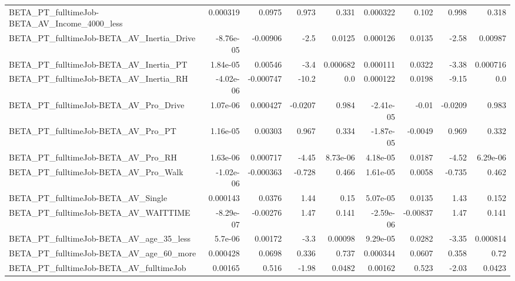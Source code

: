 \begin{tabular}{lrrrrrrrr}
BETA\_PT\_fulltimeJob-BETA\_AV\_Income\_4000\_less       &    0.000319 &       0.0975 &    0.973 &    0.331 &   0.000322 &       0.102 &        0.998 &         0.318 \\
BETA\_PT\_fulltimeJob-BETA\_AV\_Inertia\_Drive          &   -8.76e-05 &     -0.00906 &     -2.5 &   0.0125 &   0.000126 &      0.0135 &        -2.58 &       0.00987 \\
BETA\_PT\_fulltimeJob-BETA\_AV\_Inertia\_PT             &    1.84e-05 &      0.00546 &     -3.4 & 0.000682 &   0.000111 &      0.0322 &        -3.38 &      0.000716 \\
BETA\_PT\_fulltimeJob-BETA\_AV\_Inertia\_RH             &   -4.02e-06 &    -0.000747 &    -10.2 &      0.0 &   0.000122 &      0.0198 &        -9.15 &           0.0 \\
BETA\_PT\_fulltimeJob-BETA\_AV\_Pro\_Drive              &    1.07e-06 &     0.000427 &  -0.0207 &    0.984 &  -2.41e-05 &       -0.01 &      -0.0209 &         0.983 \\
BETA\_PT\_fulltimeJob-BETA\_AV\_Pro\_PT                 &    1.16e-05 &      0.00303 &    0.967 &    0.334 &  -1.87e-05 &     -0.0049 &        0.969 &         0.332 \\
BETA\_PT\_fulltimeJob-BETA\_AV\_Pro\_RH                 &    1.63e-06 &     0.000717 &    -4.45 & 8.73e-06 &   4.18e-05 &      0.0187 &        -4.52 &      6.29e-06 \\
BETA\_PT\_fulltimeJob-BETA\_AV\_Pro\_Walk               &   -1.02e-06 &    -0.000363 &   -0.728 &    0.466 &   1.61e-05 &      0.0058 &       -0.735 &         0.462 \\
BETA\_PT\_fulltimeJob-BETA\_AV\_Single                 &    0.000143 &       0.0376 &     1.44 &     0.15 &   5.07e-05 &      0.0135 &         1.43 &         0.152 \\
BETA\_PT\_fulltimeJob-BETA\_AV\_WAITTIME               &   -8.29e-07 &     -0.00276 &     1.47 &    0.141 &  -2.59e-06 &    -0.00837 &         1.47 &         0.141 \\
BETA\_PT\_fulltimeJob-BETA\_AV\_age\_35\_less            &     5.7e-06 &      0.00172 &     -3.3 &  0.00098 &   9.29e-05 &      0.0282 &        -3.35 &      0.000814 \\
BETA\_PT\_fulltimeJob-BETA\_AV\_age\_60\_more            &    0.000428 &       0.0698 &    0.336 &    0.737 &   0.000344 &      0.0607 &        0.358 &          0.72 \\
BETA\_PT\_fulltimeJob-BETA\_AV\_fulltimeJob            &     0.00165 &        0.516 &    -1.98 &   0.0482 &    0.00162 &       0.523 &        -2.03 &        0.0423 \\

\end{tabular}
